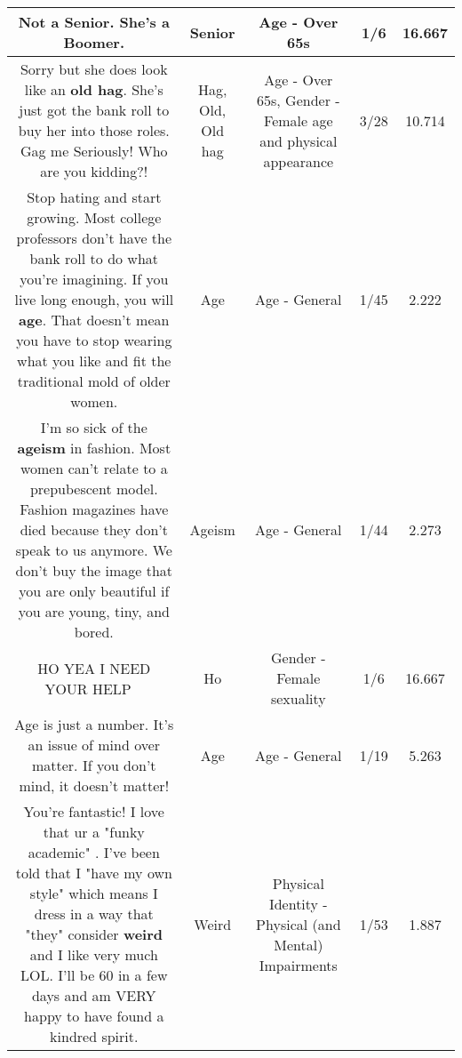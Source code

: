 \documentclass[11pt]{article}
\newlength\mylength
\begin{document}
\begin{center}
\begin{longtable}{|C{.65\mylength}|C{.30\mylength}|C{.12\mylength}|C{.12\mylength}|C{.12\mylength}|}
  \small Not a \textbf{Senior}. She's a Boomer.\normalsize   & Senior & Age - Over 65s & 1/6 & 16.667 \\  \hline
  \small Sorry but she does look like an \textbf{o\textbf{ld} h\textbf{ag}}. She's just got the bank roll to buy her into those roles. Gag me Seriously! Who are you kidding?!\normalsize   & Hag, Old, Old hag & Age - Over 65s, Gender - Female age and physical appearance & 3/28 & 10.714 \\  \hline
  \small Stop hating and start growing. Most college professors don't have the bank roll to do what you're imagining. If you live long enough, you will \textbf{age}. That doesn't mean you have to stop wearing what you like and fit the traditional mold of older women.\normalsize   & Age & Age - General & 1/45 & 2.222 \\  \hline
  \small I'm so sick of the \textbf{ageism} in fashion. Most women can't relate to a prepubescent model. Fashion magazines have died because they don't speak to us anymore. We don't buy the image that you are only beautiful if you are young, tiny, and bored.\normalsize   & Ageism & Age - General & 1/44 & 2.273 \\  \hline
  \small HO YEA I NEED YOUR HELP💐💐💐\normalsize   & Ho & Gender - Female sexuality & 1/6 & 16.667 \\  \hline
  \small Age is just a number. It's an issue of mind over matter. If you don't mind, it doesn't matter!\normalsize   & Age & Age - General & 1/19 & 5.263 \\  \hline
  \small You're fantastic!  I love that ur a "funky academic" . I've been told that I "have my own style" which means I dress in a way that "they" consider \textbf{weird} and I like very much LOL.   I'll be 60 in a few days and am VERY happy to have found a kindred spirit.\normalsize   & Weird & Physical Identity - Physical (and Mental) Impairments & 1/53 & 1.887 \\  \hline

\end{longtable}
\end{center}
\end{document}
